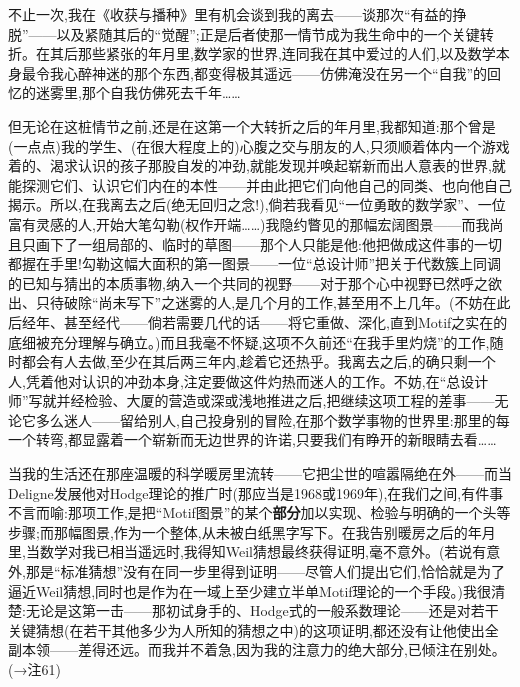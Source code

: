 不止一次,我在《收获与播种》里有机会谈到我的离去——谈那次“有益的挣脱”——以及紧随其后的“觉醒”;正是后者使那一情节成为我生命中的一个关键转折。在其后那些紧张的年月里,数学家的世界,连同我在其中爱过的人们,以及数学本身最令我心醉神迷的那个东西,都变得极其遥远——仿佛淹没在另一个“自我”的回忆的迷雾里,那个自我仿佛死去千年……

但无论在这桩情节之前,还是在这第一个大转折之后的年月里,我都知道:那个曾是(一点点)我的学生、(在很大程度上的)心腹之交与朋友的人,只须顺着体内一个游戏着的、渴求认识的孩子那股自发的冲劲,就能发现并唤起崭新而出人意表的世界,就能探测它们、认识它们内在的本性——并由此把它们向他自己的同类、也向他自己揭示。所以,在我离去之后(绝无回归之念!),倘若我看见“一位勇敢的数学家”、一位富有灵感的人,开始大笔勾勒(权作开端……)我隐约瞥见的那幅宏阔图景——而我尚且只画下了一组局部的、临时的草图——那个人只能是他:他把做成这件事的一切都握在手里!勾勒这幅大面积的第一图景——一位“总设计师”把关于\dmark{}代数簇上同调的已知与猜出的本质事物,纳入一个共同的视野——对于那个心中视野已然呼之欲出、只待破除“尚未写下”之迷雾的人,是几个月的工作,甚至用不上几年。(不妨在此后经年、甚至经代——倘若需要几代的话——将它重做、深化,直到Motif之实在的底细被充分理解与确立。)而且我毫不怀疑,这项不久前还“在我手里灼烧”的工作,随时都会有人去做,至少在其后两三年内,趁着它还热乎。我离去之后,的确只剩一个人,凭着他对认识的冲劲本身,注定要做这件灼热而迷人的工作。不妨,在“总设计师”写就并经检验、大厦的营造或深或浅地推进之后,把继续这项工程的差事——无论它多么迷人——留给别人,自己投身别的冒险,在那个数学事物的世界里:那里的每一个转弯,都显露着一个崭新而无边世界的许诺,只要我们有睁开的新眼睛去看……

当我的生活还在那座温暖的科学暖房里流转——它把尘世的喧嚣隔绝在外——而当Deligne发展他对Hodge理论的推广时(那应当是1968或1969年),在我们之间,有件事不言而喻:那项工作,是把“Motif图景”的某个\textbf{部分}加以实现、检验与明确的一个头等步骤;而那幅图景,作为一个整体,从未被白纸黑字写下。在我告别暖房之后的年月里,当数学对我已相当遥远时,我得知Weil猜想最终获得证明,毫不意外。(若说有意外,那是“标准猜想”没有在同一步里得到证明——尽管人们提出它们,恰恰就是为了逼近Weil猜想,同时也是作为在一域上至少建立半单Motif理论的一个手段。)我很清楚:无论是这第一击\dmark{}——那初试身手的、Hodge式的一般系数理论——还是对若干关键猜想(在若干其他多少为人所知的猜想之中)的这项证明,都还没有让他使出全副本领——差得还远。而我并不着急,因为我的注意力的绝大部分,已倾注在别处。(→注61)

